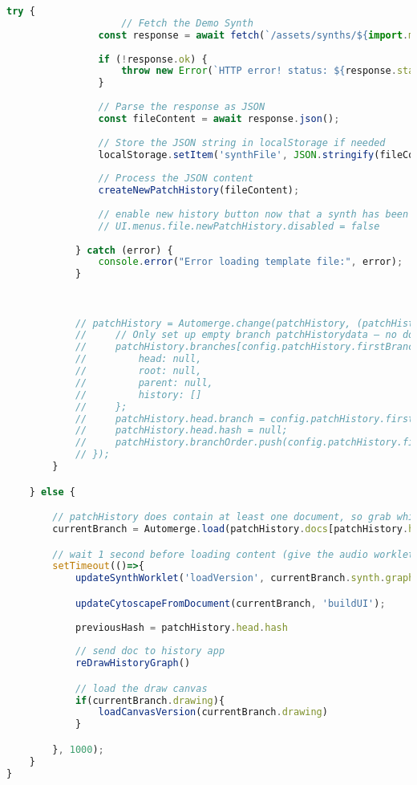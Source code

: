 \begin{lstlisting}[language=JavaScript, caption={Initial peer setup when joining a room}, label={lst:automerge-initialization}]
            try {
                    // Fetch the Demo Synth
                const response = await fetch(`/assets/synths/${import.meta.env.VITE_FIRST_SYNTH}.fpsynth`);
                
                if (!response.ok) {
                    throw new Error(`HTTP error! status: ${response.status}`);
                }
                
                // Parse the response as JSON
                const fileContent = await response.json();
                
                // Store the JSON string in localStorage if needed
                localStorage.setItem('synthFile', JSON.stringify(fileContent));
                
                // Process the JSON content
                createNewPatchHistory(fileContent);
        
                // enable new history button now that a synth has been loaded
                // UI.menus.file.newPatchHistory.disabled = false
              
            } catch (error) {
                console.error("Error loading template file:", error);
            }
       

        
            // patchHistory = Automerge.change(patchHistory, (patchHistory) => {
            //     // Only set up empty branch patchHistorydata — no doc yet
            //     patchHistory.branches[config.patchHistory.firstBranchName] = {
            //         head: null,
            //         root: null,
            //         parent: null,
            //         history: []
            //     };
            //     patchHistory.head.branch = config.patchHistory.firstBranchName;
            //     patchHistory.head.hash = null;
            //     patchHistory.branchOrder.push(config.patchHistory.firstBranchName);
            // });
        }

    } else {

        // patchHistory does contain at least one document, so grab whichever is the one that was last looked at
        currentBranch = Automerge.load(patchHistory.docs[patchHistory.head.branch]);

        // wait 1 second before loading content (give the audio worklet a moment to load)
        setTimeout(()=>{
            updateSynthWorklet('loadVersion', currentBranch.synth.graph, null, currentBranch.type)

            updateCytoscapeFromDocument(currentBranch, 'buildUI');
            
            previousHash = patchHistory.head.hash
            
            // send doc to history app
            reDrawHistoryGraph()

            // load the draw canvas
            if(currentBranch.drawing){
                loadCanvasVersion(currentBranch.drawing)
            }

        }, 1000);
    }
}

\end{lstlisting}

